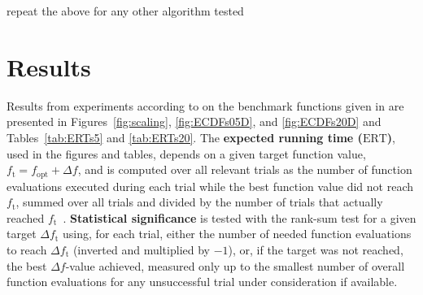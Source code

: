 \documentclass{sig-alternate}
\newcommand{\ERT}{\ensuremath{\mathrm{ERT}}}
\newcommand{\Df}{\ensuremath{\Delta f}}
\newcommand{\fopt}{\ensuremath{f_\mathrm{opt}}}
\newcommand{\ftarget}{\ensuremath{f_\mathrm{t}}}
\newcommand{\change}[1]{{\color{red} #1}}
\begin{document}
\change{repeat the above for any other algorithm tested}


\section{Results}

Results from experiments according to \cite{hansen2012exp} on the benchmark
functions given in \cite{wp200902_2010,hansen2012noi} are presented in 
Figures~\ref{fig:scaling}, \ref{fig:ECDFs05D}, and \ref{fig:ECDFs20D} and
Tables~\ref{tab:ERTs5} and \ref{tab:ERTs20}.
The \textbf{expected running time (\ERT)}, used in the figures and tables,
depends on a given target function value, $\ftarget=\fopt+\Df$, and is computed
over all relevant trials as the number of function evaluations executed during
each trial while the best function value did not reach \ftarget, summed over
all trials and divided by the number of trials that actually reached \ftarget\
\cite{hansen2012exp,price1997dev}.
\textbf{Statistical significance} is tested with the rank-sum test for a given
target $\Delta\ftarget$ using, for each trial, either the number of needed
function evaluations to reach $\Delta\ftarget$ (inverted and multiplied by
$-1$), or, if the target was not reached, the best $\Df$-value achieved,
measured only up to the smallest number of overall function evaluations for any
unsuccessful trial under consideration if available.



\end{document}
